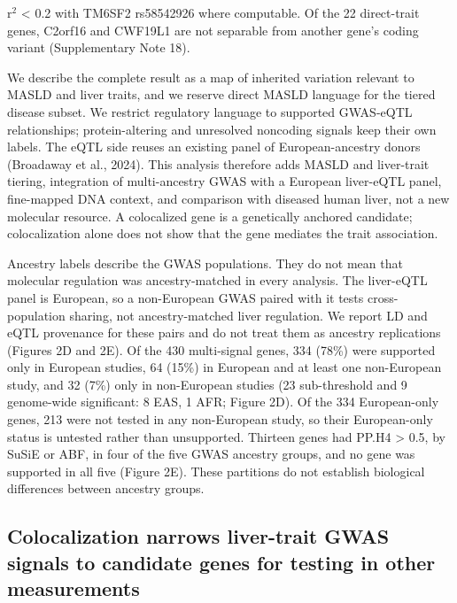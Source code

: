r$^2$ \textless{} 0.2 with TM6SF2 rs58542926 where computable. Of the 22 direct-trait genes, C2orf16 and CWF19L1 are not separable from another gene's coding variant (Supplementary Note 18).

We describe the complete result as a map of inherited variation relevant to MASLD and liver traits, and we reserve direct MASLD language for the tiered disease subset. We restrict regulatory language to supported GWAS-eQTL relationships; protein-altering and unresolved noncoding signals keep their own labels. The eQTL side reuses an existing panel of European-ancestry donors (Broadaway et al., 2024). This analysis therefore adds MASLD and liver-trait tiering, integration of multi-ancestry GWAS with a European liver-eQTL panel, fine-mapped DNA context, and comparison with diseased human liver, not a new molecular resource. A colocalized gene is a genetically anchored candidate; colocalization alone does not show that the gene mediates the trait association.

Ancestry labels describe the GWAS populations. They do not mean that molecular regulation was ancestry-matched in every analysis. The liver-eQTL panel is European, so a non-European GWAS paired with it tests cross-population sharing, not ancestry-matched liver regulation. We report LD and eQTL provenance for these pairs and do not treat them as ancestry replications (Figures 2D and 2E). Of the 430 multi-signal genes, 334 (78\%) were supported only in European studies, 64 (15\%) in European and at least one non-European study, and 32 (7\%) only in non-European studies (23 sub-threshold and 9 genome-wide significant: 8 EAS, 1 AFR; Figure 2D). Of the 334 European-only genes, 213 were not tested in any non-European study, so their European-only status is untested rather than unsupported. Thirteen genes had PP.H4 \textgreater{} 0.5, by SuSiE or ABF, in four of the five GWAS ancestry groups, and no gene was supported in all five (Figure 2E). These partitions do not establish biological differences between ancestry groups.

\subsection{Colocalization narrows liver-trait GWAS signals to candidate genes for testing in other measurements}\label{coloc-narrows-candidates}

